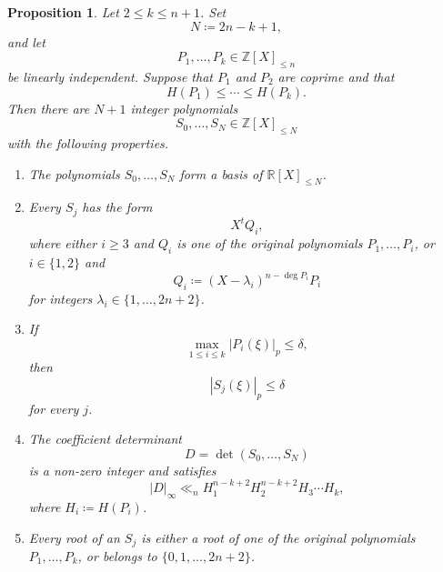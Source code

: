\documentclass[12pt,reqno]{amsart}
\newtheorem{proposition}[theorem]{Proposition}
\theoremstyle{definition}
\theoremstyle{remark}
\newcommand{\Z}{\mathbb Z}
\newcommand{\R}{\mathbb R}
\begin{document}
\begin{proposition}\label{prop:generalized-basis}
Let $2\leq k\leq n+1$. Set
$$
N\coloneqq2n-k+1,
$$
and let
$$
P_1,\ldots,P_k\in\Z[X]_{\leq n}
$$
be linearly independent. Suppose that $P_1$ and $P_2$ are coprime and that
$$
H(P_1)\leq\cdots\leq H(P_k).
$$
Then there are $N+1$ integer polynomials
$$
S_0,\ldots,S_N\in\Z[X]_{\leq N}
$$
with the following properties.

\begin{enumerate}[label=\textup{(\roman*)}]
\item The polynomials $S_0,\ldots,S_N$ form a basis of $\R[X]_{\leq N}$.

\item Every $S_j$ has the form
$$
X^tQ_i,
$$
where either $i\geq3$ and $Q_i$ is one of the original polynomials $P_1,\ldots,P_i$, or $i\in\{1,2\}$ and
$$
Q_i\coloneqq(X-\lambda_i)^{n-\deg P_i}P_i
$$
for integers $\lambda_i\in\{1,\ldots,2n+2\}$.

\item If
$$
\max_{1\leq i\leq k}|P_i(\xi)|_p\leq\delta,
$$
then
$$
|S_j(\xi)|_p\leq\delta
$$
for every $j$.

\item The coefficient determinant
$$
D=\det(S_0,\ldots,S_N)
$$
is a non-zero integer and satisfies
$$
|D|_\infty
\ll_n
H_1^{n-k+2}H_2^{n-k+2}H_3\cdots H_k,
$$
where $H_i\coloneqq H(P_i)$.

\item Every root of an $S_j$ is either a root of one of the original
polynomials $P_1,\ldots,P_k$, or belongs to
$\{0,1,\ldots,2n+2\}$.
\end{enumerate}
\end{proposition}
\end{document}
